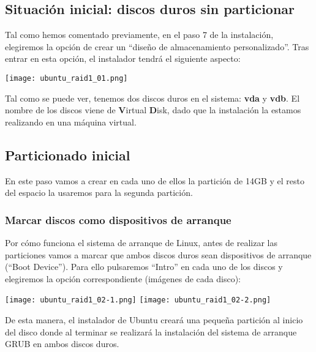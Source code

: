 \subsection{Situación inicial: discos duros sin particionar}
Tal como hemos comentado previamente, en el paso 7 de la instalación, elegiremos la opción de crear un “diseño de almacenamiento personalizado”. Tras entrar en esta opción, el instalador tendrá el siguiente aspecto:

\begin{center}
    \vspace{-10pt}
    \texttt{[image: ubuntu\_raid1\_01.png]}
    \vspace{-20pt}
\end{center}

Tal como se puede ver, tenemos dos discos duros en el sistema: \textbf{vda} y \textbf{vdb}. El nombre de los discos viene de \textbf{V}irtual \textbf{D}isk, dado que la instalación la estamos realizando en una máquina virtual.

\subsection{Particionado inicial}
En este paso vamos a crear en cada uno de ellos la partición de 14GB y  el resto del espacio la usaremos para la segunda partición.

\subsubsection{Marcar discos como dispositivos de arranque}
Por cómo funciona el sistema de arranque de Linux, antes de realizar las particiones vamos a marcar que ambos discos duros sean dispositivos de arranque (“Boot Device”). Para ello pulsaremos “Intro” en cada uno de los discos y elegiremos la opción correspondiente (imágenes de cada disco):

\begin{center}
    \vspace{-10pt}
    \texttt{[image: ubuntu\_raid1\_02-1.png]}
    \hspace{3cm}
    \texttt{[image: ubuntu\_raid1\_02-2.png]}
    \vspace{-20pt}
\end{center}

De esta manera, el instalador de Ubuntu creará una pequeña partición al inicio del disco donde al terminar se realizará la instalación del sistema de arranque GRUB en ambos discos duros.



